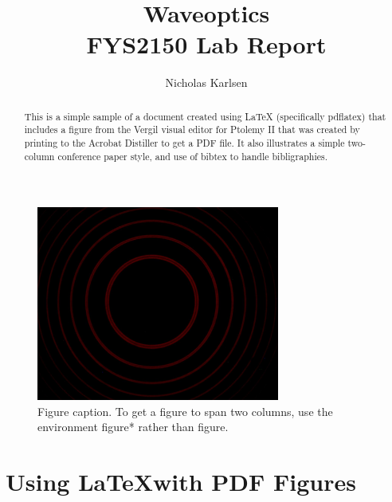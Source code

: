 \documentclass[10pt,twocolumn]{article}
\begin{document}
\title{Waveoptics \\ \normalsize{FYS2150 Lab Report}}

\author{Nicholas Karlsen
}

\maketitle
\thispagestyle{empty}

\begin{abstract}
   This is a simple sample of a document created using \LaTeX
   (specifically pdflatex)
   that includes a figure from the Vergil visual editor for Ptolemy II
   that was created by printing to the Acrobat Distiller to get a PDF file.
   It also illustrates a simple two-column conference paper style,
   and use of bibtex to handle bibligraphies.
\end{abstract}

\begin{figure}[!b]
  \begin{center}
    \includegraphics[width=8cm]{scripts/figs/ZEEMAN1A.jpg}
  \end{center}

  \caption{\small Figure caption. To get a figure to span two
      columns, use the environment figure* rather than figure.}
  \label{fig-label}
\end{figure}

\section{Using \LaTeX with PDF Figures}
\end{document}
